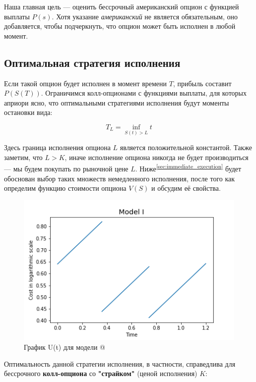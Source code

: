 \documentclass[a4paper,12pt]{article}
\makeatletter
\theoremstyle{definition}
\newcommand*{\rom}[1]{\expandafter\@slowromancap\romannumeral #1@}
\makeatother
\begin{document}
Наша главная цель --- оценить бессрочный американский
опцион с функцией выплаты $P(s)$. Хотя указание \textit{американский} не является обязательным, оно добавляется, чтобы подчеркнуть, что опцион может быть исполнен в любой момент.

\subsection{Оптимальная стратегия исполнения}

Если такой опцион будет исполнен в момент времени $T$, прибыль составит $P(S(T))$. Ограничимся колл-опционами с функциями выплаты, для которых априори ясно, что оптимальными стратегиями исполнения будут моменты остановки вида:

\begin{equation}\label{eq:optimal_excersize}
T_L = \inf\limits_{S(t) > L}{t}
\end{equation}

Здесь граница исполнения опциона $L$ является положительной константой. Также заметим, что $L > K$, иначе исполнение опциона никогда не будет производиться --- мы будем покупать по рыночной цене $L$. Ниже\textsuperscript{\ref{sec:immediate_execution}} будет обоснован выбор таких множеств немедленного исполнения, после того как определим функцию стоимости опциона $V(S)$ и обсудим её свойства. 


\begin{figure}[htbp]
\label{fig:model1track}
\centerline{\includegraphics[scale=0.7]{img/model1.png}}
\caption{График U(t) для модели \rom{1}}
\end{figure}

Оптимальность данной стратегии исполнения, в частности, справедлива для бессрочного \textbf{колл-опциона} со \textbf{"страйком"} (ценой исполнения) $K$:
\end{document}
